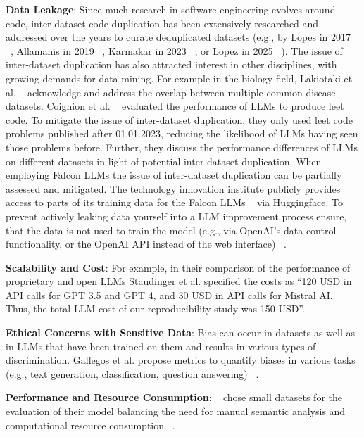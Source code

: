 \begin{itemize}
\textbf{Data Leakage}:
Since much research in software engineering evolves around code, inter-dataset code duplication has been extensively researched and addressed over the years to curate deduplicated datasets (e.g., by Lopes in 2017 ~\cite{DBLP:journals/pacmpl/LopesMMSYZSV17}, Allamanis in 2019 ~\cite{10.1145/3359591.3359735}, Karmakar in 2023 ~\cite{DBLP:journals/ese/KarmakarAR23}, or Lopez in 2025 ~\cite{DBLP:journals/tse/LopezCSSV25}).
The issue of inter-dataset duplication has also attracted interest in other disciplines, with growing demands for data mining. For example in the biology field, Lakiotaki et al. ~\cite{DBLP:journals/biodb/LakiotakiVTGT18} acknowledge and address the overlap between multiple common disease datasets. 
Coignion et al. ~\cite{DBLP:conf/ease/CoignionQR24} evaluated the performance of LLMs to produce leet code. To mitigate the issue of inter-dataset duplication, they only used leet code problems published after 01.01.2023, reducing the likelihood of LLMs having seen those problems before. Further, they discuss the performance differences of LLMs on different datasets in light of potential inter-dataset duplication.
When employing Falcon LLMs the issue of inter-dataset duplication can be partially assessed and mitigated. The technology innovation institute publicly provides access to parts of its training data for the Falcon LLMs ~\cite{technology_innovation_institute_2023} via Huggingface.
To prevent actively leaking data yourself into a LLM improvement process ensure, that the data is not used to train the model (e.g., via OpenAI's data control functionality, or the OpenAI API instead of the web interface) ~\cite{DBLP:conf/eacl/BalloccuSLD24}.

\textbf{Scalability and Cost}:
For example, in their comparison of the performance of proprietary and open LLMs Staudinger et al. specified the costs as \enquote{120 USD in API calls for GPT 3.5 and GPT 4, and 30 USD in API calls for Mistral AI. Thus, the total LLM cost of our reproducibility study was 150 USD}. ~\cite{DBLP:conf/sigir-ap/StaudingerKPLH24}

\textbf{Ethical Concerns with Sensitive Data}:
Bias can occur in datasets as well as in LLMs that have been trained on them and results in various types of discrimination. Gallegos et al. propose metrics to quantify biases in various tasks (e.g., text generation, classification, question answering) ~\cite{DBLP:journals/corr/abs-2309-00770}.

\textbf{Performance and Resource Consumption}:
~\cite{tinnessoftware} chose small datasets for the evaluation of their model balancing the need for manual semantic analysis and computational resource consumption ~\cite{tinnessoftware}.


\end{itemize}
